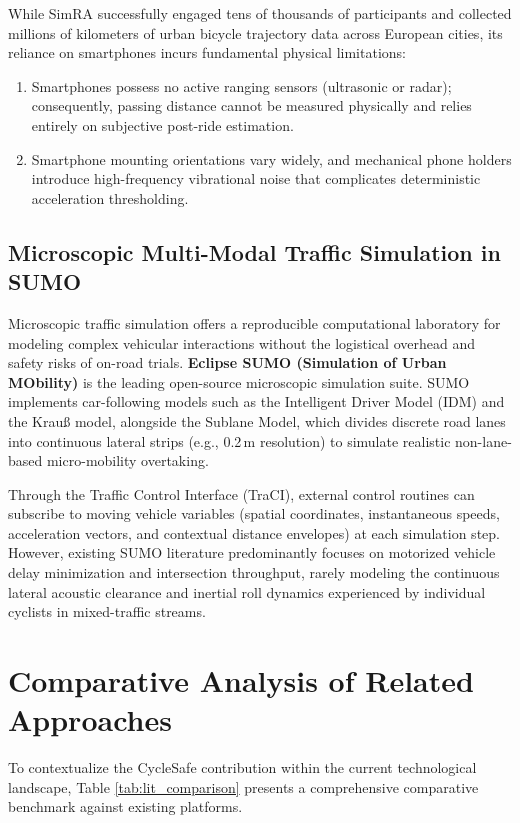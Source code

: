 While SimRA successfully engaged tens of thousands of participants and collected millions of kilometers of urban bicycle trajectory data across European cities, its reliance on smartphones incurs fundamental physical limitations:
\begin{enumerate}
    \item Smartphones possess no active ranging sensors (ultrasonic or radar); consequently, passing distance cannot be measured physically and relies entirely on subjective post-ride estimation.
    \item Smartphone mounting orientations vary widely, and mechanical phone holders introduce high-frequency vibrational noise that complicates deterministic acceleration thresholding.
\end{enumerate}

\subsection{Microscopic Multi-Modal Traffic Simulation in SUMO}
Microscopic traffic simulation offers a reproducible computational laboratory for modeling complex vehicular interactions without the logistical overhead and safety risks of on-road trials. \textbf{Eclipse SUMO (Simulation of Urban MObility)} \cite{krajzewicz2012recent, lopez2018microscopic} is the leading open-source microscopic simulation suite. SUMO implements car-following models such as the Intelligent Driver Model (IDM) \cite{treiber2000congested} and the Krau{\ss} model, alongside the Sublane Model, which divides discrete road lanes into continuous lateral strips (e.g., 0.2\,m resolution) to simulate realistic non-lane-based micro-mobility overtaking.

Through the Traffic Control Interface (TraCI), external control routines can subscribe to moving vehicle variables (spatial coordinates, instantaneous speeds, acceleration vectors, and contextual distance envelopes) at each simulation step. However, existing SUMO literature predominantly focuses on motorized vehicle delay minimization and intersection throughput, rarely modeling the continuous lateral acoustic clearance and inertial roll dynamics experienced by individual cyclists in mixed-traffic streams.

\section{Comparative Analysis of Related Approaches}
To contextualize the CycleSafe contribution within the current technological landscape, Table \ref{tab:lit_comparison} presents a comprehensive comparative benchmark against existing platforms.

